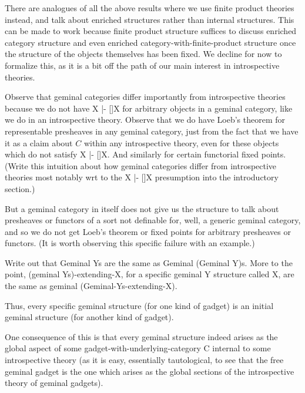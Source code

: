 There are analogues of all the above results where we use finite product theories instead, and talk about enriched structures rather than internal structures. This can be made to work because finite product structure suffices to discuss enriched category structure and even enriched category-with-finite-product structure once the structure of the objects themselves has been fixed. We decline for now to formalize this, as it is a bit off the path of our main interest in introspective theories. 

\begin{TODOblock}
Observe that geminal categories differ importantly from introspective theories because we do not have X |- []X for arbitrary objects in a geminal category, like we do in an introspective theory. Observe that we do have Loeb's theorem for representable presheaves in any geminal category, just from the fact that we have it as a claim about $C$ within any introspective theory, even for these objects which do not satisfy X |- []X. And similarly for certain functorial fixed points. (Write this intuition about how geminal categories differ from introspective theories most notably wrt to the X |- []X presumption into the introductory section.)

But a geminal category in itself does not give us the structure to talk about presheaves or functors of a sort not definable for, well, a generic geminal category, and so we do not get Loeb's theorem or fixed points for arbitrary presheaves or functors. (It is worth observing this specific failure with an example.)
\end{TODOblock}

\begin{TODOblock}
Write out that Geminal Ys are the same as Geminal (Geminal Y)s. More to the point, (geminal Ys)-extending-X, for a specific geminal Y structure called X, are the same as geminal (Geminal-Ys-extending-X).

Thus, every specific geminal structure (for one kind of gadget) is an initial geminal structure (for another kind of gadget).

One consequence of this is that every geminal structure indeed arises as the global aspect of some gadget-with-underlying-category C internal to some introspective theory (as it is easy, essentially tautological, to see that the free geminal gadget is the one which arises as the global sections of the introspective theory of geminal gadgets).
\end{TODOblock}

